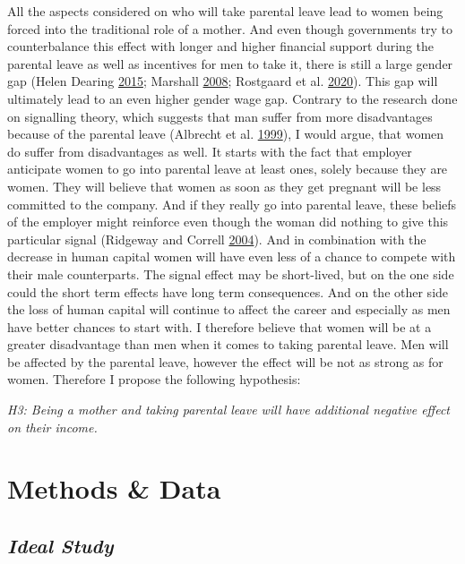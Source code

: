 \documentclass[
  11pt,
]{article}
\begin{document}
All the aspects considered on who will take parental leave lead to women being forced into the traditional role of a mother.
And even though governments try to counterbalance this effect with longer and higher financial support during the parental leave as well as incentives for men to take it, there is still a large gender gap (Helen Dearing \protect\hyperlink{ref-helen_dearing_does_2015}{2015}; Marshall \protect\hyperlink{ref-marshall_fathers_2008}{2008}; Rostgaard et al. \protect\hyperlink{ref-rostgaard_parental_2020}{2020}).
This gap will ultimately lead to an even higher gender wage gap.
Contrary to the research done on signalling theory, which suggests that man suffer from more disadvantages because of the parental leave (Albrecht et al. \protect\hyperlink{ref-albrecht_career_1999}{1999}), I would argue, that women do suffer from disadvantages as well. It starts with the fact that employer anticipate women to go into parental leave at least ones, solely because they are women. They will believe that women as soon as they get pregnant will be less committed to the company. And if they really go into parental leave, these beliefs of the employer might reinforce even though the woman did nothing to give this particular signal (Ridgeway and Correll \protect\hyperlink{ref-ridgeway_unpacking_2004}{2004}). And in combination with the decrease in human capital women will have even less of a chance to compete with their male counterparts. The signal effect may be short-lived, but on the one side could the short term effects have long term consequences. And on the other side the loss of human capital will continue to affect the career and especially as men have better chances to start with. I therefore believe that women will be at a greater disadvantage than men when it comes to taking parental leave. Men will be affected by the parental leave, however the effect will be not as strong as for women.
Therefore I propose the following hypothesis:

\emph{H3: Being a mother and taking parental leave will have additional negative effect on their income.}

\hypertarget{methods-data}{%
\section{Methods \& Data}\label{methods-data}}

\hypertarget{ideal-study}{%
\subsection*{\texorpdfstring{\emph{Ideal Study}}{Ideal Study}}\label{ideal-study}}
\end{document}

